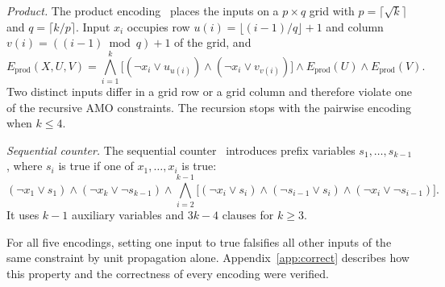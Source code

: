 \documentclass[a4paper,fleqn]{cas-sc}
\begin{document}
\textit{Product.} The product encoding~\cite{product} places the inputs on
a $p\times q$ grid with $p=\lceil\sqrt k\rceil$ and $q=\lceil k/p\rceil$.
Input $x_i$ occupies row $u(i)=\lfloor(i-1)/q\rfloor+1$ and column
$v(i)=((i-1)\bmod q)+1$ of the grid, and
\begin{equation}
E_{\mathrm{prod}}(X,U,V)=\bigwedge_{i=1}^k\big[(\neg x_i\vee u_{u(i)})\wedge
(\neg x_i\vee v_{v(i)})\big]\wedge E_{\mathrm{prod}}(U)\wedge E_{\mathrm{prod}}(V).
\end{equation}
Two distinct inputs differ in a grid row or a grid column and therefore
violate one of the recursive AMO constraints. The recursion stops with
the pairwise encoding when $k\le4$.

\textit{Sequential counter.} The sequential counter~\cite{sinz} introduces
prefix variables $s_1,\ldots,s_{k-1}$, where $s_i$ is true if one of
$x_1,\ldots,x_i$ is true:
\begin{equation}
(\neg x_1\vee s_1)\wedge(\neg x_k\vee\neg s_{k-1})\wedge
\bigwedge_{i=2}^{k-1}\big[(\neg x_i\vee s_i)\wedge(\neg s_{i-1}\vee s_i)
\wedge(\neg x_i\vee\neg s_{i-1})\big].
\end{equation}
It uses $k-1$ auxiliary variables and $3k-4$ clauses for $k\ge3$.

For all five encodings, setting one input to true falsifies all other
inputs of the same constraint by unit propagation alone. Appendix~\ref{app:correct}
describes how this property and the correctness of every encoding were
verified.
\end{document}
